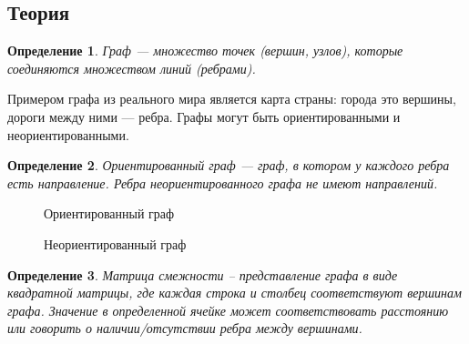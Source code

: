 \documentclass[12pt]{article}
\newtheorem{definition}{Определение}[section]
\theoremstyle{problem_style}
\begin{document}
\subsection{Теория}
\begin{definition}
Граф — множество точек (вершин, узлов), которые соединяются множеством линий (ребрами).
\end{definition}
Примером графа из реального мира является карта страны: города это вершины, дороги между ними — ребра. Графы могут быть ориентированными и неориентированными.
\begin{definition}
Ориентированный граф — граф, в котором у каждого ребра есть направление. Ребра неориентированного графа не имеют направлений. 
\end{definition}
\begin{figure}[h]
    \centering
    \begin{minipage}[b]{0.45\textwidth}
        \centering
        \caption{Ориентированный граф}
        \label{fig:dir_graph}
    \end{minipage}
    \hfill
    \begin{minipage}[b]{0.45\textwidth}
        \centering
        \caption{Неориентированный граф}
        \label{fig:undir_graph}
    \end{minipage}
\end{figure}
\begin{definition}
Матрица смежности – представление графа в виде квадратной матрицы, где каждая строка и столбец соответствуют вершинам графа. Значение в определенной ячейке может соответствовать расстоянию  или говорить о наличии/отсутствии ребра между вершинами.
\end{definition}
\end{document}
